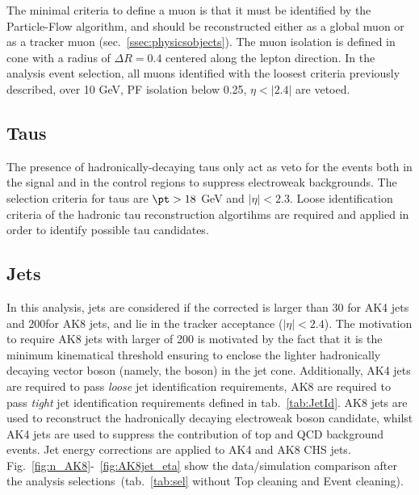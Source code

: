 The minimal criteria to define a muon is that it must be identified by the Particle-Flow algorithm, and should be reconstructed either as a global muon or as a tracker muon (sec.~\ref{ssec:physicsobjects}). The muon isolation is defined in cone with a radius of $\Delta R=0.4$ centered along the lepton direction. In the analysis event selection, all muons identified with the loosest criteria previously described, \pt over 10 GeV, PF isolation below 0.25, $\eta<|2.4|$ are vetoed.
 


\subsection{Taus}\label{sec:tau}
The presence of hadronically-decaying taus only act as veto for the events both in the signal and in the control regions to suppress electroweak backgrounds. The selection criteria for taus are $\pt > 18$ GeV and $|\eta| < 2.3$. Loose identification criteria of the hadronic tau reconstruction algortihms are required and applied in order to identify possible tau candidates.


\subsection{Jets}\label{ssec:jets}
In this analysis, jets are considered if the corrected \pt is larger than 30 \GeV for AK4 jets and 200\GeV for AK8 jets, and lie in the tracker acceptance ($|\eta|<2.4$). The motivation to require AK8 jets with \pt larger of 200 \GeV is motivated by the fact that it is the minimum kinematical threshold ensuring to enclose the lighter hadronically decaying vector boson (namely, the \W boson) in the jet cone. Additionally, AK4 jets are required to pass \emph{loose} jet identification requirements, AK8 are required to pass \emph{tight} jet identification requirements defined in tab.~\ref{tab:JetId}. AK8 jets are used to reconstruct the hadronically decaying electroweak boson candidate, whilst AK4 jets are used to suppress the contribution of top and QCD background events. Jet energy corrections are applied to AK4 and AK8 CHS jets. Fig.~\ref{fig:n_AK8}-~\ref{fig:AK8jet_eta} show the data/simulation comparison after the analysis selections~(tab.~\ref{tab:sel} without Top cleaning and Event cleaning).


